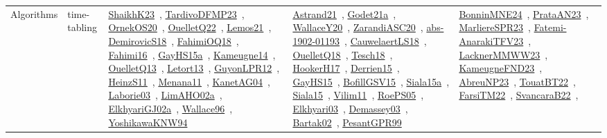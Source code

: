 {\begin{longtable}{lp{3cm}>{\raggedright\arraybackslash}p{6cm}>{\raggedright\arraybackslash}p{6cm}>{\raggedright\arraybackslash}p{8cm}}
Algorithms & time-tabling & \href{../works/ShaikhK23.pdf}{ShaikhK23}~\cite{ShaikhK23}, \href{../works/TardivoDFMP23.pdf}{TardivoDFMP23}~\cite{TardivoDFMP23}, \href{../works/OrnekOS20.pdf}{OrnekOS20}~\cite{OrnekOS20}, \href{../works/OuelletQ22.pdf}{OuelletQ22}~\cite{OuelletQ22}, \href{../works/Lemos21.pdf}{Lemos21}~\cite{Lemos21}, \href{../works/DemirovicS18.pdf}{DemirovicS18}~\cite{DemirovicS18}, \href{../works/FahimiOQ18.pdf}{FahimiOQ18}~\cite{FahimiOQ18}, \href{../works/Fahimi16.pdf}{Fahimi16}~\cite{Fahimi16}, \href{../works/GayHS15a.pdf}{GayHS15a}~\cite{GayHS15a}, \href{../works/Kameugne14.pdf}{Kameugne14}~\cite{Kameugne14}, \href{../works/OuelletQ13.pdf}{OuelletQ13}~\cite{OuelletQ13}, \href{../works/Letort13.pdf}{Letort13}~\cite{Letort13}, \href{../works/GuyonLPR12.pdf}{GuyonLPR12}~\cite{GuyonLPR12}, \href{../works/HeinzS11.pdf}{HeinzS11}~\cite{HeinzS11}, \href{../works/Menana11.pdf}{Menana11}~\cite{Menana11}, \href{../works/KanetAG04.pdf}{KanetAG04}~\cite{KanetAG04}, \href{../works/Laborie03.pdf}{Laborie03}~\cite{Laborie03}, \href{../works/LimAHO02a.pdf}{LimAHO02a}~\cite{LimAHO02a}, \href{../works/ElkhyariGJ02a.pdf}{ElkhyariGJ02a}~\cite{ElkhyariGJ02a}, \href{../works/Wallace96.pdf}{Wallace96}~\cite{Wallace96}, \href{../works/YoshikawaKNW94.pdf}{YoshikawaKNW94}~\cite{YoshikawaKNW94} & \href{../works/Astrand21.pdf}{Astrand21}~\cite{Astrand21}, \href{../works/Godet21a.pdf}{Godet21a}~\cite{Godet21a}, \href{../works/WallaceY20.pdf}{WallaceY20}~\cite{WallaceY20}, \href{../works/ZarandiASC20.pdf}{ZarandiASC20}~\cite{ZarandiASC20}, \href{../works/abs-1902-01193.pdf}{abs-1902-01193}~\cite{abs-1902-01193}, \href{../works/CauwelaertLS18.pdf}{CauwelaertLS18}~\cite{CauwelaertLS18}, \href{../works/OuelletQ18.pdf}{OuelletQ18}~\cite{OuelletQ18}, \href{../works/Tesch18.pdf}{Tesch18}~\cite{Tesch18}, \href{../works/HookerH17.pdf}{HookerH17}~\cite{HookerH17}, \href{../works/Derrien15.pdf}{Derrien15}~\cite{Derrien15}, \href{../works/GayHS15.pdf}{GayHS15}~\cite{GayHS15}, \href{../works/BofillGSV15.pdf}{BofillGSV15}~\cite{BofillGSV15}, \href{../works/Siala15a.pdf}{Siala15a}~\cite{Siala15a}, \href{../works/Siala15.pdf}{Siala15}~\cite{Siala15}, \href{../works/Vilim11.pdf}{Vilim11}~\cite{Vilim11}, \href{../works/RoePS05.pdf}{RoePS05}~\cite{RoePS05}, \href{../works/Elkhyari03.pdf}{Elkhyari03}~\cite{Elkhyari03}, \href{../works/Demassey03.pdf}{Demassey03}~\cite{Demassey03}, \href{../works/Bartak02.pdf}{Bartak02}~\cite{Bartak02}, \href{../works/PesantGPR99.pdf}{PesantGPR99}~\cite{PesantGPR99} & \href{../works/BonninMNE24.pdf}{BonninMNE24}~\cite{BonninMNE24}, \href{../works/PrataAN23.pdf}{PrataAN23}~\cite{PrataAN23}, \href{../works/MarliereSPR23.pdf}{MarliereSPR23}~\cite{MarliereSPR23}, \href{../works/Fatemi-AnarakiTFV23.pdf}{Fatemi-AnarakiTFV23}~\cite{Fatemi-AnarakiTFV23}, \href{../works/LacknerMMWW23.pdf}{LacknerMMWW23}~\cite{LacknerMMWW23}, \href{../works/KameugneFND23.pdf}{KameugneFND23}~\cite{KameugneFND23}, \href{../works/AbreuNP23.pdf}{AbreuNP23}~\cite{AbreuNP23}, \href{../works/TouatBT22.pdf}{TouatBT22}~\cite{TouatBT22}, \href{../works/FarsiTM22.pdf}{FarsiTM22}~\cite{FarsiTM22}, \href{../works/SvancaraB22.pdf}{SvancaraB22}~\cite{SvancaraB22}, 
\end{longtable}}
